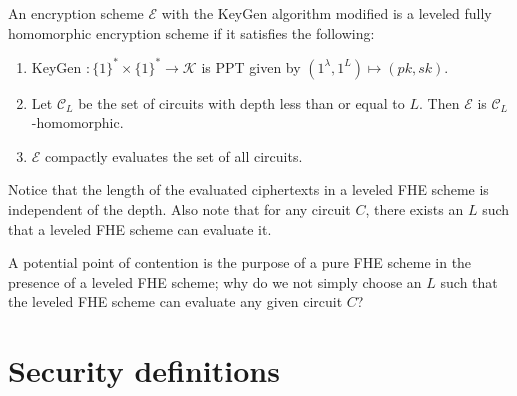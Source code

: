 \begin{definition}
An encryption scheme $\mathcal{E}$ with the KeyGen algorithm modified is a leveled fully homomorphic encryption scheme if it satisfies the following:
\begin{enumerate}[label={$\bullet$}]
    \item KeyGen $\colon \{1\}^* \times \{1\}^* \to \mathcal{K}$ is PPT given by $(1^{\lambda},1^L) \mapsto (pk,sk)$.
    \item Let $\mathcal{C}_L$ be the set of circuits with depth less than or equal to $L$. Then $\mathcal{E}$ is $\mathcal{C}_L$-homomorphic.
    \item $\mathcal{E}$ compactly evaluates the set of all circuits. 
\end{enumerate}
\end{definition}
\begin{remark}
    Notice that the length of the evaluated ciphertexts in a leveled FHE scheme is independent of the depth.
    Also note that for any circuit $C$, there exists an $L$ such that a leveled FHE scheme can evaluate it.
\end{remark}

A potential point of contention is the purpose of a pure FHE scheme in the presence of a leveled FHE scheme; why do we not simply choose an $L$ such that the leveled FHE scheme can evaluate any given circuit $C$?


\section{Security definitions}

